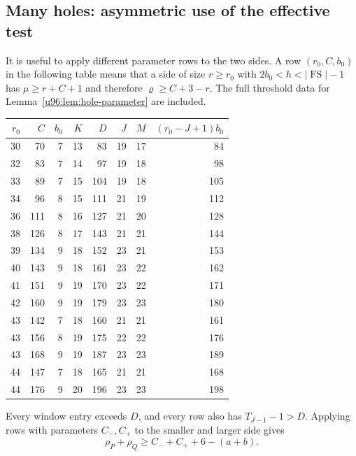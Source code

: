 \documentclass[11pt,a4paper]{article}
\theoremstyle{remark}
\newcommand{\FS}{\operatorname{FS}}
\newcommand{\rhoD}{\varrho}
\begin{document}
\subsection{Many holes: asymmetric use of the effective test}
It is useful to apply different parameter rows to the two sides. A row
$(r_0,C,b_0)$ in the following table means that a side of size $r\geq r_0$
with $2b_0<h<|\FS|-1$ has $\mu\geq r+C+1$ and therefore
$\rhoD\geq C+3-r$. The full threshold data for
Lemma~\ref{u96:lem:hole-parameter} are included.
\begin{center}\small
\begin{tabular}{rrrrrrrr}
\toprule
$r_0$&$C$&$b_0$&$K$&$D$&$J$&$M$&$(r_0-J+1)b_0$\\
\midrule
30&70&7&13&83&19&17&84\\
32&83&7&14&97&19&18&98\\
33&89&7&15&104&19&18&105\\
34&96&8&15&111&21&19&112\\
36&111&8&16&127&21&20&128\\
38&126&8&17&143&21&21&144\\
39&134&9&18&152&23&21&153\\
40&143&9&18&161&23&22&162\\
41&151&9&19&170&23&22&171\\
42&160&9&19&179&23&23&180\\
43&142&7&18&160&21&21&161\\
43&156&8&19&175&22&22&176\\
43&168&9&19&187&23&23&189\\
44&147&7&18&165&21&21&168\\
44&176&9&20&196&23&23&198\\
\bottomrule
\end{tabular}
\end{center}
Every window entry exceeds $D$, and every row also has $T_{J-1}-1>D$.
Applying rows with parameters $C_-,C_+$ to the smaller and larger side
gives
\begin{equation}
 \rho_P+\rho_Q\geq C_-+C_++6-(a+b).
 \label{u96:eq:asymmetric-hole-penalty}
\end{equation}
\end{document}
